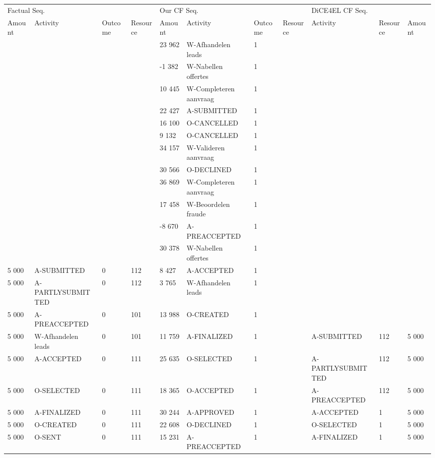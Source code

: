 \begin{tabular}{lllllllllll}
\toprule
\multicolumn{4}{l}{Factual Seq.} & \multicolumn{4}{l}{Our CF Seq.} & \multicolumn{3}{l}{DiCE4EL CF Seq.} \\
Amount & Activity & Outcome & Resource & Amount & Activity & Outcome & Resource & Activity & Resource & Amount \\
\midrule
 &  &  &  & 23 962 & W-Afhandelen leads & 1 &  &  &  &  \\
 &  &  &  & -1 382 & W-Nabellen offertes & 1 &  &  &  &  \\
 &  &  &  & 10 445 & W-Completeren aanvraag & 1 &  &  &  &  \\
 &  &  &  & 22 427 & A-SUBMITTED & 1 &  &  &  &  \\
 &  &  &  & 16 100 & O-CANCELLED & 1 &  &  &  &  \\
 &  &  &  & 9 132 & O-CANCELLED & 1 &  &  &  &  \\
 &  &  &  & 34 157 & W-Valideren aanvraag & 1 &  &  &  &  \\
 &  &  &  & 30 566 & O-DECLINED & 1 &  &  &  &  \\
 &  &  &  & 36 869 & W-Completeren aanvraag & 1 &  &  &  &  \\
 &  &  &  & 17 458 & W-Beoordelen fraude & 1 &  &  &  &  \\
 &  &  &  & -8 670 & A-PREACCEPTED & 1 &  &  &  &  \\
 &  &  &  & 30 378 & W-Nabellen offertes & 1 &  &  &  &  \\
5 000 & A-SUBMITTED & 0 & 112 & 8 427 & A-ACCEPTED & 1 &  &  &  &  \\
5 000 & A-PARTLYSUBMITTED & 0 & 112 & 3 765 & W-Afhandelen leads & 1 &  &  &  &  \\
5 000 & A-PREACCEPTED & 0 & 101 & 13 988 & O-CREATED & 1 &  &  &  &  \\
5 000 & W-Afhandelen leads & 0 & 101 & 11 759 & A-FINALIZED & 1 &  & A-SUBMITTED & 112 & 5 000 \\
5 000 & A-ACCEPTED & 0 & 111 & 25 635 & O-SELECTED & 1 &  & A-PARTLYSUBMITTED & 112 & 5 000 \\
5 000 & O-SELECTED & 0 & 111 & 18 365 & O-ACCEPTED & 1 &  & A-PREACCEPTED & 112 & 5 000 \\
5 000 & A-FINALIZED & 0 & 111 & 30 244 & A-APPROVED & 1 &  & A-ACCEPTED & 1 & 5 000 \\
5 000 & O-CREATED & 0 & 111 & 22 608 & O-DECLINED & 1 &  & O-SELECTED & 1 & 5 000 \\
5 000 & O-SENT & 0 & 111 & 15 231 & A-PREACCEPTED & 1 &  & A-FINALIZED & 1 & 5 000 \\

\end{tabular}
